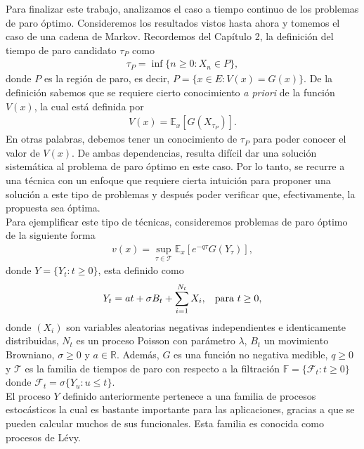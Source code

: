 Para finalizar este trabajo, analizamos el caso a tiempo continuo de los problemas de paro óptimo. Consideremos los resultados vistos hasta ahora y tomemos el caso de una cadena de Markov. Recordemos del Capítulo 2, la definición del tiempo de paro candidato $\tau_P$ como
\begin{align*}
	\tau_P = \inf \{ n \geq 0 : X_n \in P \},
\end{align*}
donde $P$ es la región de paro, es decir, $P = \{ x \in E : V(x) = G(x) \}$. De la definición sabemos que se requiere cierto conocimiento \emph{a priori} de la función $V(x)$, la cual está definida por
\begin{align*}
	V(x) = \mathbb{E}_x [G(X_{\tau_P})].
\end{align*}
En otras palabras, debemos tener un conocimiento de $\tau_P$ para poder conocer el valor de $V(x)$. De ambas dependencias, resulta difícil dar una solución sistemática al problema de paro óptimo en este caso. Por lo tanto, se recurre a una técnica con un enfoque que requiere cierta intuición para proponer una solución a este tipo de problemas y después poder verificar que, efectivamente, la propuesta sea óptima. \\

Para ejemplificar este tipo de técnicas, consideremos problemas de paro óptimo de la siguiente forma
\begin{align}
	v(x) = \sup_{\tau \in \mathcal{T}} \mathbb{E}_x [e^{-q \tau} G(Y_{\tau})], \label{problema_paro}
\end{align}
donde $Y = \{ Y_t : t \geq 0 \}$, esta definido como
\begin{align}
	Y_t = at + \sigma B_t + \sum_{i = 1}^{N_t} X_i, \hspace{0.3cm} \text{para } t \geq 0, \label{levy_salto}
\end{align}
donde $(X_i)$ son variables aleatorias negativas independientes e identicamente distribuidas, $N_t$ es un proceso Poisson con parámetro $\lambda$, $B_t$ un movimiento Browniano, $\sigma \geq 0$ y $a \in \mathbb{R}$. Además, $G$ es una función no negativa medible, $q \geq 0$ y $\mathcal{T}$ es la familia de tiempos de paro con respecto a la filtración $\mathbb{F} = \{ \mathcal{F}_t : t \geq 0 \}$ donde $\mathcal{F}_t = \sigma\{ Y_u : u \leq t \}$. \\

El proceso $Y$ definido anteriormente pertenece a una familia de procesos estocásticos la cual es bastante importante para las aplicaciones, gracias a que se pueden calcular muchos de sus funcionales. Esta familia es conocida como procesos de Lévy.

